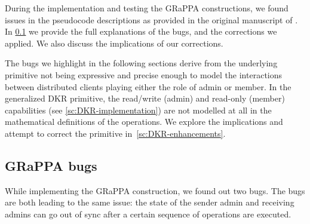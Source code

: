 During the implementation and testing the GRaPPA constructions,
we found issues in the pseudocode descriptions as provided
in the original manuscript of \cite{GKP}.
In \cref{sc:GRaPPA-bugs} we provide the full explanations of the bugs, 
and the corrections we applied. 
We also discuss the implications of our corrections. 

The bugs we highlight in the following sections
derive from the underlying primitive not being expressive and
precise enough to model the interactions between distributed clients
playing either the role of admin or member.
In the generalized DKR primitive, the read/write (admin) 
and read-only (member) capabilities (see \cref{sc:DKR-implementation})
are not modelled at all in the mathematical definitions of the operations.
We explore the implications and attempt to correct
the primitive in~\cref{sc:DKR-enhancements}.

\subsection{GRaPPA bugs}\label{sc:GRaPPA-bugs}

While implementing the GRaPPA construction, we found out two bugs.
The bugs are both leading to the same issue: the state of the
sender admin and receiving admins can go out of sync after a certain
sequence of operations are executed.

